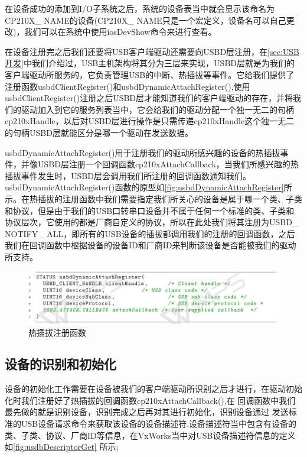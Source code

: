 	在设备成功的添加到I/O子系统之后，系统的设备表当中就会显示该命名为CP210X\_ NAME的设备(CP210X\_ NAME只是一个宏定义，设备名可以自己更改)，我们可以在系统中使用iosDevShow命令来进行查看。
	

	在设备注册完之后我们还要将USB客户端驱动还需要向USBD层注册，在\autoref{sec:USB开发}中我们介绍过，USB主机架构将其分为三层来实现，USBD层就是为我们的客户端驱动所服务的，它负责管理USB的中断、热插拔等事件。它给我们提供了注册函数usbdClientRegister()和usbdDynamicAttachRegister(),使用usbdClientRegister()注册之后USBD层才能知道我们的客户端驱动的存在，并将我们的驱动加入到它的服务列表当中，它会给我们的驱动分配一个独一无二的句柄cp210xHandle，以后对USBD层进行操作是只需传递cp210xHandle这个独一无二的句柄USBD层就能区分是哪一个驱动在发送数据。
	
	usbdDynamicAttachRegister()用于注册我们的驱动所感兴趣的设备的热插拔事件，并像USBD层注册一个回调函数cp210xAttachCallback，当我们所感兴趣的热插拔事件发生时，USBD层会调用我们所注册的回调函数通知我们。usbdDynamicAttachRegister()函数的原型如\autoref{fig:usbdDynamicAttachRegister}所示。在热插拔的注册函数中我们需要指定我们所关心的设备是属于哪一个类、子类和协议，但是由于我们的USB口转串口设备并不属于任何一个标准的类、子类和协议层次，它使用的都是厂商自定义的协议，所以在此处我们将其注册为USBD\_ NOTIFY\_ ALL，即所有的USB设备的插拔都调用我们的注册的回调函数，之后我们在回调函数中根据设备的设备ID和厂商ID来判断该设备是否能被我们的驱动所支持。
\begin{figure}[!h]
\centering
\includegraphics[width=1.0\textwidth]{./graphics/usbdDynamicAttachRegister.pdf}
\caption{热插拔注册函数}\label{fig:usbdDynamicAttachRegister}
\end{figure}


\subsection{设备的识别和初始化}

	设备的初始化工作需要在设备被我们的客户端驱动所识别之后才进行，在驱动初始化时我们注册好了热插拔的回调函数cp210xAttachCallback(),在
	回调函数中我们最先做的就是识别设备，识别完成之后再对其进行初始化，识别设备通过
	发送标准的USB设备请求命令来获取该设备的设备描述符,设备描述符当中包含有设备的类、子类、协议、厂商ID等信息，在VxWorks当中对USB设备描述符信息的定义如\autoref{fig:usdbDescriptorGet} 所示;

